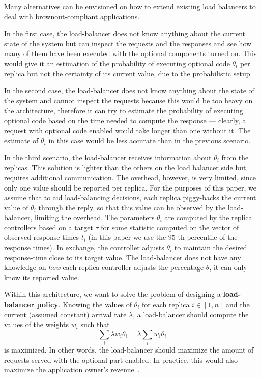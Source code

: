Many alternatives can be envisioned on how to extend existing load
balancers to deal with brownout-compliant applications.

In the first case, the load-balancer does not know anything about the
current state of the system but can inspect the requests and the
responses and see how many of them have been executed with the
optional components turned on. This would give it an estimation of the
probability of executing optional code $\theta_i$ per replica but not
the certainty of its current value, due to the probabilistic setup.

In the second case, the load-balancer does not know anything about the
state of the system and cannot inspect the requests because this would
be too heavy on the architecture, therefore it can try to estimate the
probability of executing optional code based on the time needed to
compute the response --- clearly, a request with optional code enabled
would take longer than one without it. The estimate of $\theta_i$ in
this case would be less accurate than in the previous scenario.

In the third scenario, the load-balancer receives information about
$\theta_i$ from the replicas. This solution is lighter than the others
on the load balancer side but requires additional communication. The
overhead, however, is very limited, since only one value should be
reported per replica. For the purposes of this paper, we assume that
to aid load-balancing decisions, each replica piggy-backs the current
value of $\theta_i$ through the reply, so that this value can be
observed by the load-balancer, limiting the overhead. The parameters
$\theta_i$ are computed by the replica controllers based on a target
$\bar{\tau}$ for some statistic computed on the vector of observed
response-times $t_i$ (in this paper we use the $95$-th percentile of
the response times). In exchange, the controller adjusts $\theta_i$ to
maintain the desired response-time close to its target value. The
load-balancer does not have any knowledge on \emph{how} each replica
controller adjusts the percentage $\theta$, it can only know its
reported value.

Within this architecture, we want to solve the problem of designing a
{\bf load-balancer policy}. Knowing the values of $\theta_i$ for each
replica $i \in [1, n]$ and the current (assumed constant) arrival rate
$\lambda$, a load-balancer should compute the values of the weights
$w_i$ such that
\begin{equation}
\sum_{i} \lambda w_i \theta_i = \lambda \sum_i w_i \theta_i
\label{eq:objective}
\end{equation}
is maximized. In other words, the load-balancer should maximize the
amount of requests served with the optional part enabled. In practice,
this would also maximize the application owner's
revenue~\cite{cloudish-tr}.

